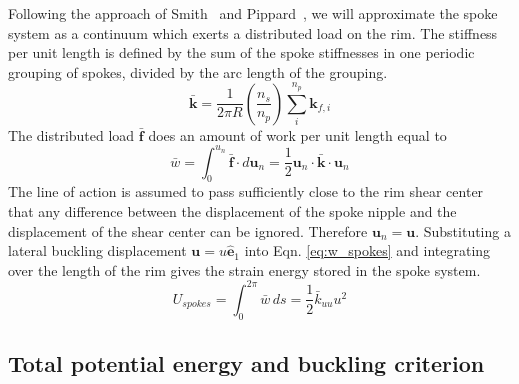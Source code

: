 \documentclass{bmd2016p}
\begin{document}
Following the approach of Smith~\cite{Smith1901a} and Pippard~\cite{Pippard1932d}, we will approximate the spoke system as a continuum which exerts a distributed load on the rim. The stiffness per unit length is defined by the sum of the spoke stiffnesses in one periodic grouping of spokes, divided by the arc length of the grouping.
	\begin{equation}\label{eq:kbar}
	\bar{\bm{k}} = \frac{1}{2\pi R}\left(\frac{n_s}{n_p}\right) \sum_i^{n_p} \bm{k}_{f, i}
	\end{equation}
	The distributed load $\bar{\bm{f}}$ does an amount of work per unit length equal to
	\begin{equation}\label{eq:w_spokes}
	\bar{w} = \int_0^{u_n} \bar{\bm{f}} \cdot d\bm{u}_n = \frac{1}{2} \bm{u}_n \cdot \bar{\bm{k}} \cdot \bm{u}_n
	\end{equation}
The line of action is assumed to pass sufficiently close to the rim shear center that any difference between the displacement of the spoke nipple and the displacement of the shear center can be ignored. Therefore $\bm{u}_n = \bm{u}$. Substituting a lateral buckling displacement $\bm{u}=u\hat{\bm{e}}_1$ into Eqn. \ref{eq:w_spokes} and integrating over the length of the rim gives the strain energy stored in the spoke system.
	\begin{equation}\label{eq:Us}
	U_{spokes} = \int_0^{2\pi} \bar{w} \, ds = \frac{1}{2} \bar{k}_{uu}u^2
	\end{equation}


\subsection{Total potential energy and buckling criterion}
\end{document}
